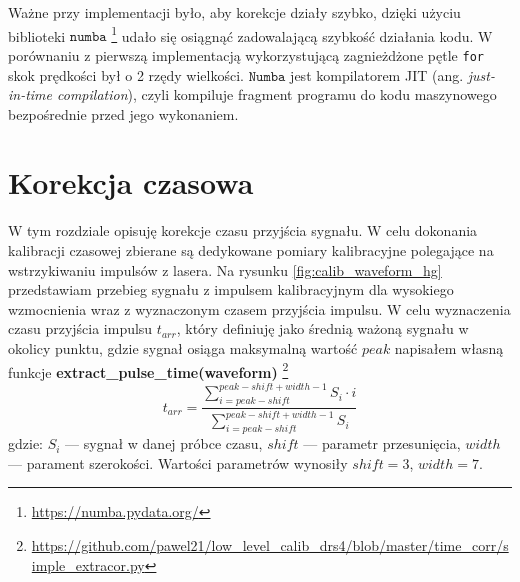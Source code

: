 \documentclass[a4paper,11pt,twoside]{article}
\begin{document}
Ważne przy implementacji było, aby korekcje działy szybko, dzięki użyciu biblioteki $\mathtt{numba}$ \footnote{\url{https://numba.pydata.org/}} udało się osiągnąć zadowalającą szybkość działania kodu. W porównaniu z pierwszą implementacją wykorzystującą zagnieżdżone pętle \texttt{for} skok prędkości był o 2 rzędy wielkości.  $\mathtt{Numba}$ jest kompilatorem JIT (ang. \textsl{just-in-time compilation}), czyli kompiluje fragment programu do kodu maszynowego bezpośrednie przed jego wykonaniem. 

\newpage
\section{Korekcja czasowa}
W tym rozdziale opisuję korekcje czasu przyjścia sygnału. 
W celu dokonania kalibracji czasowej zbierane są dedykowane pomiary kalibracyjne polegające na wstrzykiwaniu impulsów z lasera. Na rysunku \ref{fig:calib_waveform_hg} przedstawiam przebieg sygnału z impulsem kalibracyjnym dla wysokiego wzmocnienia wraz z wyznaczonym czasem przyjścia impulsu.
W celu wyznaczenia czasu przyjścia impulsu $t_{arr}$, który definiuję jako średnią ważoną sygnału w okolicy punktu, gdzie sygnał osiąga maksymalną wartość $peak$ napisałem własną funkcje {\bf{extract\_pulse\_time(waveform)}} \footnote{ \url{https://github.com/pawel21/low_level_calib_drs4/blob/master/time_corr/simple_extracor.py}}
\begin{equation}
t_{arr} = \frac{ \sum_{i=peak - shift}^{peak - shift + width - 1} S_i \cdot i }{ \sum_{i=peak - shift}^{peak - shift + width -1} S_i}
\label{egn:time}
\end{equation} 
gdzie: $S_i$ --- sygnał w danej próbce czasu, $shift$ --- parametr przesunięcia, $width$ --- parament szerokości. Wartości parametrów wynosiły $shift = 3$, $width = 7$. \\
\end{document}
